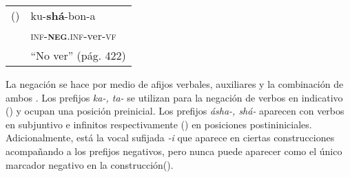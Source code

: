 {%
\begin{tabular}{ll}
() & ku-\textbf{shá}-bon-a  \\
& \textsc{inf-\textbf{neg}.inf}-ver-\textsc{vf} \\
& ``No ver'' (pág. 422)
\end{tabular} \vspace{0.3cm}

}

La negación se hace por medio de afijos verbales, auxiliares y la combinación de ambos \textcolor{MidnightBlue}{\citep{fwe}}. Los prefijos {\setmainfont{Charis SIL} \textit{ka-, ta-}} se utilizan para la negación de verbos en indicativo () y ocupan una posición preinicial. Los prefijos {\setmainfont{Charis SIL} \textit{ásha-, shá-}} aparecen con verbos en subjuntivo e infinitos respectivamente () en posiciones postininiciales. Adicionalmente, está la vocal sufijada {\setmainfont{Charis SIL} \textit{-i}} que aparece en ciertas construcciones acompañando a los prefijos negativos, pero nunca puede aparecer como el único marcador negativo en la construcción(). 